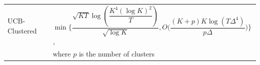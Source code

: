 \begin{center}
\begin{tabular}{ll}
UCB-Clustered             &\hspace*{5em}$\min\bigg\lbrace\dfrac{\sqrt{KT}\log{(\dfrac{K^{4}(\log K)^{2}}{T})}}{\sqrt{\log K}},O\bigg(\dfrac{(K+p)K\log (T\Delta^{4})}{p\Delta}\bigg)\bigg\rbrace$, \\& \hspace*{5em} where $p$ is the number of clusters \\
\end{tabular}
\end{center}


